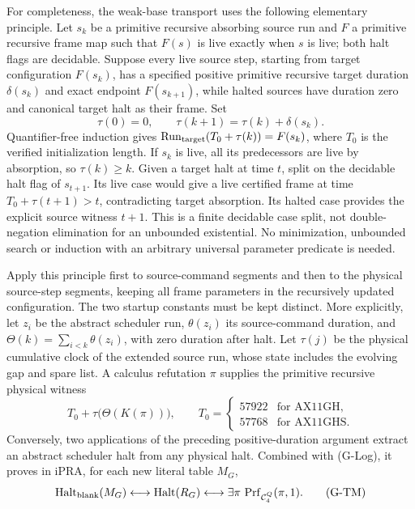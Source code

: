 For completeness, the weak-base transport uses the following elementary
principle.  Let $s_k$ be a primitive recursive absorbing source run and
$F$ a primitive recursive frame map such that $F(s)$ is live exactly
when $s$ is live; both halt flags are decidable.  Suppose every live
source step, starting from target configuration $F(s_k)$, has a
specified positive primitive recursive target duration $\delta(s_k)$
and exact endpoint $F(s_{k+1})$, while halted sources have duration
zero and canonical target halt as their frame.  Set
\[
 \tau(0)=0,\qquad \tau(k+1)=\tau(k)+\delta(s_k).
\]
Quantifier-free induction gives
$\operatorname{Run}_{\rm target}(T_0+\tau(k))=F(s_k)$,
where $T_0$ is the verified initialization length.  If $s_k$ is
live, all its predecessors are live by absorption, so $\tau(k)\ge k$.
Given a target halt at time $t$, split on the decidable halt flag of
$s_{t+1}$.  Its live case would give a live certified frame at time
$T_0+\tau(t+1)>t$, contradicting target absorption.  Its halted case
provides the explicit source witness $t+1$.  This is a finite decidable
case split, not double-negation elimination for an unbounded existential.
No minimization, unbounded search or induction with an arbitrary
universal parameter predicate is needed.

Apply this principle first to source-command segments and then to the
physical source-step segments, keeping all frame parameters in the
recursively updated configuration.  The two startup constants must be
kept distinct.  More explicitly, let $z_i$ be the abstract scheduler run,
$\theta(z_i)$ its source-command duration, and
$\Theta(k)=\sum_{i<k}\theta(z_i)$, with zero duration after halt.
Let $\tau(j)$ be the physical cumulative clock of the extended source
run, whose state includes the evolving gap and spare list.  A calculus
refutation $\pi$ supplies the primitive recursive physical witness
\[
             T_0+\tau\bigl(\Theta(K(\pi))\bigr),\qquad
 T_0=\begin{cases}57922&\text{for AX11GH},\\
                  57768&\text{for AX11GHS}.
       \end{cases}
\]
Conversely, two applications of the preceding positive-duration
argument extract an abstract scheduler halt from any physical halt.
Combined with (G-Log), it proves in iPRA, for each new
literal table $M_G$,
\[
 \operatorname{Halt}_{\rm blank}(M_G)
 \longleftrightarrow\operatorname{Halt}(R_G)
 \longleftrightarrow
       \exists\pi\,\operatorname{Prf}_{\mathcal C_4^Q}(\pi,1). \tag{G-TM}
\]


